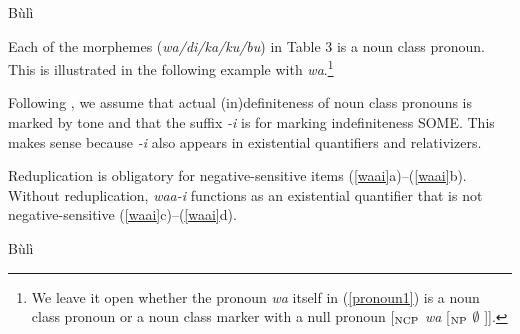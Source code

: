 \documentclass[output=paper,colorlinks,citecolor=brown]{langscibook}
\begin{document}
\ea Bùlì
\z
\z


Each of the morphemes (\textit{wa/di/ka/ku/bu}) in Table 3 is a noun class pronoun. This is illustrated in the following example with \textit{wa}.\footnote{We leave it open whether the pronoun \textit{wa} itself in (\ref{pronoun1}) is a noun class pronoun or a noun class marker with a null pronoun [$_{\textup{NCP}}$ \textit{wa} [$_{\textup{NP}}$ $\emptyset$ ]].}

{}
\z

Following \cite{HiraiwaEtAl2017}, we assume that actual (in)definiteness of noun class pronouns is marked by tone and that the suffix \textit{-i} is for marking indefiniteness SOME. This makes sense because \textit{-i} also appears in existential quantifiers and relativizers.

\z

\z

Reduplication is obligatory for negative-sensitive items (\ref{waai}a)--(\ref{waai}b). Without reduplication, \textit{waa-i} functions as an existential quantifier that is not negative-sensitive (\ref{waai}c)--(\ref{waai}d).


\ea Bùlì \label{waai}
\z
\z
\end{document}
